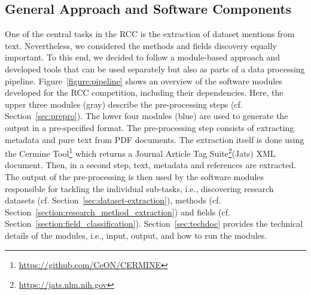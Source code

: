 
\subsection{General Approach and Software Components}
One of the central tasks in the RCC is the extraction of dataset mentions from text. 
Nevertheless, we considered the methods and fields discovery equally important.
To this end, we decided to follow a module-based approach and developed tools that can be used separately but also as parts of a data processing pipeline.
Figure~\ref{figure:pipeline} shows an overview of the software modules developed for the RCC competition, including their dependencies. Here, the upper three modules (gray) describe the pre-processing steps (cf. Section~\ref{sec:prepro}).
The lower four modules (blue) are used to generate the output in a pre-specified format. 
The pre-processing step consists of extracting metadata and pure text from PDF documents. The extraction itself is done using the Cermine Tool\footnote{\url{https://github.com/CeON/CERMINE}} which returns a Journal Article Tag Suite\footnote{\url{https://jats.nlm.nih.gov}}(Jats) XML document. Then, in a second step,
text, metadata and references are extracted. The output of the pre-processing is then used by the software modules responsible for tackling the individual sub-tasks, i.e., discovering research datasets (cf. Section~\ref{sec:dataset-extraction}), methods (cf. Section~\ref{section:research_method_extraction}) and fields (cf. Section~\ref{section:field_classification}). Section~\ref{sec:techdoc} provides the technical details of the modules, i.e., input, output, and how to run the modules. 


